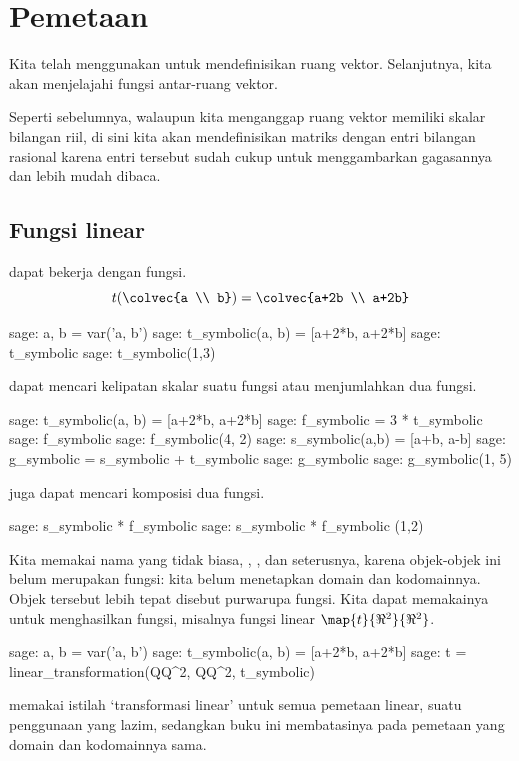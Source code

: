 \chapter{Pemetaan}\label{chapter:maps}


Kita telah menggunakan \Sage{} untuk mendefinisikan ruang vektor.
Selanjutnya, kita akan menjelajahi fungsi antar-ruang vektor.

Seperti sebelumnya, walaupun kita menganggap ruang vektor memiliki skalar
bilangan riil, di sini kita akan mendefinisikan matriks dengan entri bilangan
rasional karena entri tersebut sudah cukup untuk menggambarkan gagasannya dan
lebih mudah dibaca.
  

\section{Fungsi linear} \label{sec:linearfunctions}
\Sage{} dapat bekerja dengan fungsi.
\begin{equation*}
  t(\colvec{a \\ b})
  =\colvec{a+2b \\ a+2b}
\end{equation*}
\begin{sagecommandline}
sage: a, b = var('a, b')
sage: t_symbolic(a, b) = [a+2*b, a+2*b]         
sage: t_symbolic       
sage: t_symbolic(1,3)       
\end{sagecommandline}

\Sage{} dapat mencari kelipatan skalar suatu fungsi atau menjumlahkan dua fungsi.
\begin{sagecommandline}
sage: t_symbolic(a, b) = [a+2*b, a+2*b]         
sage: f_symbolic = 3 * t_symbolic
sage: f_symbolic
sage: f_symbolic(4, 2)
sage: s_symbolic(a,b) = [a+b, a-b]
sage: g_symbolic = s_symbolic + t_symbolic
sage: g_symbolic
sage: g_symbolic(1, 5) 
\end{sagecommandline}
\Sage{} juga dapat mencari komposisi dua fungsi.
\begin{sagecommandline}
sage: s_symbolic * f_symbolic
sage: s_symbolic * f_symbolic (1,2)
\end{sagecommandline}

Kita memakai nama yang tidak biasa,
, , dan seterusnya,
karena objek-objek ini belum merupakan fungsi: kita belum menetapkan domain
dan kodomainnya. Objek tersebut lebih tepat disebut purwarupa fungsi.
Kita dapat memakainya untuk menghasilkan fungsi, misalnya fungsi linear
$\map{t}{\Re^2}{\Re^2}$.
\begin{sagecommandline} 
sage: a, b = var('a, b')   
sage: t_symbolic(a, b) = [a+2*b, a+2*b]         
sage: t = linear_transformation(QQ^2, QQ^2, t_symbolic)
\end{sagecommandline}
\Sage{} memakai istilah `transformasi linear' untuk semua pemetaan linear,
suatu penggunaan yang lazim, sedangkan buku ini membatasinya pada pemetaan
yang domain dan kodomainnya sama.

